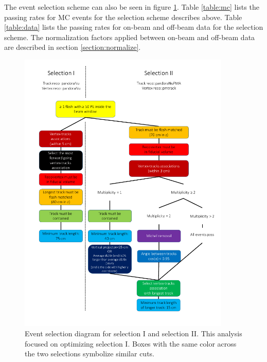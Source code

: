 The event selection scheme can also be seen in figure \ref{fig:selection}. Table \ref{table:mc} lists the passing rates for MC events for the selection scheme describes above. Table \ref{table:data} lists the passing rates for on-beam and off-beam data for the selection scheme. The normalization factors applied between on-beam and off-beam data are described in section \ref{section:normalize}.
\begin{figure}[htp!]
\includegraphics[width=0.9\textwidth]{figs/selection.png}
\caption{Event selection diagram for selection I and selection II. This analysis focused on optimizing selection I. Boxes with the same color across the two selections symbolize similar cuts.}
\label{fig:selection}
\end{figure}

